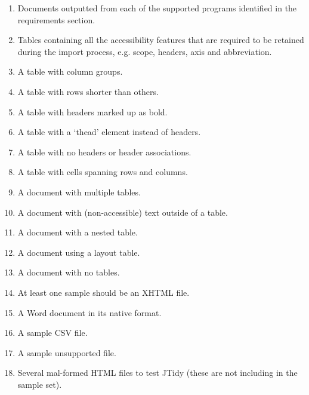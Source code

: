 \begin{enumerate}

\item Documents outputted from each of the supported programs identified
in the requirements section.

\item Tables containing all the accessibility features that are 
required to be retained during the import process, e.g. scope, headers, axis
and abbreviation.

\item A table with column groups.

\item A table with rows shorter than others.

\item A table with headers marked up as bold.

\item A table with a `thead' element instead of headers.

\item A table with no headers or header associations.

\item A table with cells spanning rows and columns.

\item A document with multiple tables.

\item A document with (non-accessible) text outside of a table.

\item A document with a nested table.

\item A document using a layout table.

\item A document with no tables.

\item At least one sample should be an XHTML file.

\item A Word document in its native format.

\item A sample CSV file.

\item A sample unsupported file.

\item Several mal-formed HTML files to test JTidy (these are not including
in the sample set).

\end{enumerate}

